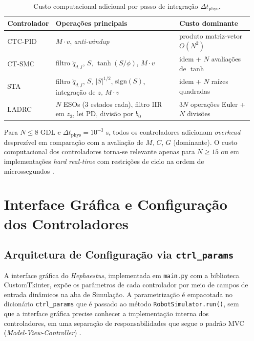 \begin{table}[h!]
\centering
\caption{Custo computacional adicional por passo de integração $\Delta t_{\text{phys}}$.}
\label{tab:ctrl_compute}
\begin{tabular}{p{3.2cm} p{4.5cm} p{5.5cm}}
\hline
\textbf{Controlador} & \textbf{Operações principais} & \textbf{Custo dominante} \\
\hline
CTC-PID & $M\cdot v$, \textit{anti-windup} & produto matriz-vetor $O(N^2)$ \\
CT-SMC & filtro $\ddot{q}_{d,f}$, $S$, $\tanh(S/\phi)$, $M\cdot v$ & idem + $N$ avaliações de $\tanh$ \\
STA & filtro $\ddot{q}_{d,f}$, $S$, $|S|^{1/2}$, $\text{sign}(S)$, integração de $z$, $M\cdot v$ & idem + $N$ raízes quadradas \\
LADRC & $N$ ESOs (3 estados cada), filtro IIR em $z_3$, lei PD, divisão por $b_0$ & $3N$ operações Euler + $N$ divisões \\
\hline
\end{tabular}
\end{table}

Para $N \leq 8$ GDL e $\Delta t_{\text{phys}} = 10^{-3}$ s, todos os controladores adicionam \textit{overhead} desprezível em comparação com a avaliação de $M$, $C$, $G$ (dominante). O custo computacional dos controladores torna-se relevante apenas para $N \geq 15$ ou em implementações \textit{hard real-time} com restrições de ciclo na ordem de microssegundos \cite{leu1986automated}.

\section{Interface Gráfica e Configuração dos Controladores}
\label{sec:gui_ctrl}

\subsection{Arquitetura de Configuração via \texttt{ctrl\_params}}

A interface gráfica do \textit{Hephaestus}, implementada em \texttt{main.py} com a biblioteca CustomTkinter, expõe os parâmetros de cada controlador por meio de campos de entrada dinâmicos na aba de Simulação. A parametrização é empacotada no dicionário \texttt{ctrl\_params} que é passado ao método \texttt{RobotSimulator.run()}, sem que a interface gráfica precise conhecer a implementação interna dos controladores, em uma separação de responsabilidades que segue o padrão MVC (\textit{Model-View-Controller}) \cite{gamma1994design}.

